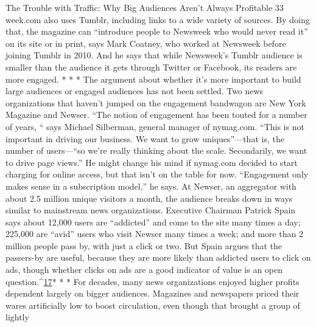 The Trouble with Traffic: Why Big Audiences Aren't Always Profitable 33
week.com also uses Tumblr, including links to a wide variety of sources. By doing
that, the magazine can ``introduce people to Newsweek who would never read
it'' on its site or in print, says Mark Coatney, who worked at Newsweek before
joining Tumblr in 2010. And he says that while Newsweek's Tumblr audience
is smaller than the audience it gets through Twitter or Facebook, its readers are
more engaged.
* * *
The argument about whether it's more important to build large audiences
or engaged audiences has not been settled. Two news organizations that haven't
jumped on the engagement bandwagon are New York Magazine and Newser.
``The notion of engagement has been touted for a number of years, “ says Michael
Silberman, general manager of nymag.com. “This is not important in driving
our business. We want to grow uniques''—that is, the number of users—``so
we're really thinking about the scale. Secondarily, we want to drive page views.''
He might change his mind if nymag.com decided to start charging for online
access, but that isn't on the table for now. ``Engagement only makes sense in a
subscription model,'' he says.
At Newser, an aggregator with about 2.5 million unique visitors a month, the
audience breaks down in ways similar to mainstream news organizations. Executive
Chairman Patrick Spain says about 12,000 users are ``addicted'' and come
to the site many times a day; 225,000 are ``avid'' users who visit Newser many
times a week; and more than 2 million people pass by, with just a click or two.
But Spain argues that the passers-by are useful, because they are more likely than
addicted users to click on ads, though whether clicks on ads are a good indicator
of value is an open question.^{\href{#endnotes-chapter-2}{17}}* * *
For decades, many news organizations enjoyed higher profits dependent
largely on bigger audiences. Magazines and newspapers priced their wares artificially
low to boost circulation, even though that brought a group of lightly


